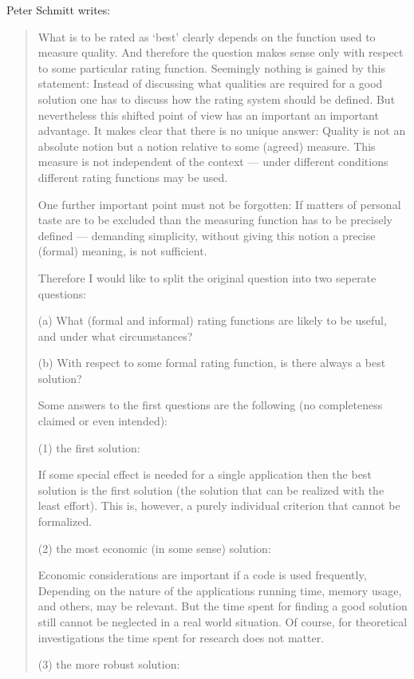 Peter Schmitt writes:
\begin{quotation}
 What is to be rated as `best' clearly depends on the function used to
 measure quality. And therefore the question makes sense only with
 respect to some particular rating function. Seemingly nothing is gained
 by this statement: Instead of discussing what qualities are required
 for a good solution one has to discuss how the rating system should be
 defined. But nevertheless this shifted point of view has an important
 an important advantage. It makes clear that there is no unique answer:
 Quality is not an  absolute notion but a notion relative to some
 (agreed) measure. This measure is not independent of the context ---
 under different conditions different rating functions may be used.

 One further important point must not be forgotten: If matters of
 personal taste are to be excluded than the measuring function has to be
 precisely defined --- demanding simplicity, without giving this notion
 a precise (formal) meaning, is not sufficient.

 Therefore I would like to split the original question into two seperate
 questions:

 (a) What (formal and informal) rating functions are likely to be
     useful, and under what circumstances?

 (b) With respect to some formal rating function, is there always a best
     solution?

 Some answers to the first questions are the following (no completeness
 claimed or even intended):

 (1) the first solution:

     If some special effect is needed for a single application then the
     best solution is the first solution (the solution that can be
     realized with the least effort). This is, however, a purely
     individual criterion that cannot be formalized.

 (2) the most economic (in some sense) solution:

     Economic considerations are important if a code is used frequently,
     Depending on the nature of the applications running time, memory
     usage, and others, may be relevant. But the time spent for finding
     a good solution still cannot be neglected in a real world
     situation. Of course, for theoretical investigations the time spent
     for research does not matter.

 (3) the more robust solution:


\end{quotation}

